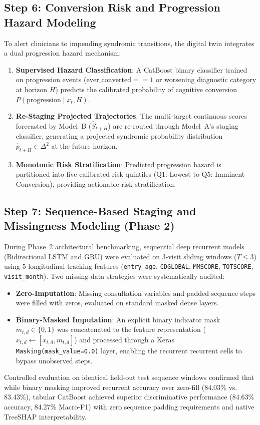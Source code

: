 \documentclass[11pt,a4paper]{article}
\begin{document}
\subsection{Step 6: Conversion Risk and Progression Hazard Modeling}
\label{sec:method_conversion}
To alert clinicians to impending syndromic transitions, the digital twin integrates a dual progression hazard mechanism:
\begin{enumerate}
    \item \textbf{Supervised Hazard Classification}: A CatBoost binary classifier trained on progression events ($\text{ever\_converted} == 1$ or worsening diagnostic category at horizon $H$) predicts the calibrated probability of cognitive conversion $P(\text{progression} \mid x_t, H)$.
    \item \textbf{Re-Staging Projected Trajectories}: The multi-target continuous scores forecasted by Model~B ($\hat{S}_{t+H}$) are re-routed through Model~A's staging classifier, generating a projected syndromic probability distribution $\hat{p}_{t+H} \in \Delta^2$ at the future horizon.
    \item \textbf{Monotonic Risk Stratification}: Predicted progression hazard is partitioned into five calibrated risk quintiles (Q1: Lowest to Q5: Imminent Conversion), providing actionable risk stratification.
\end{enumerate}

\subsection{Step 7: Sequence-Based Staging and Missingness Modeling (Phase 2)}
\label{sec:method_sequence}
During Phase~2 architectural benchmarking, sequential deep recurrent models (Bidirectional LSTM and GRU) were evaluated on 3-visit sliding windows ($T \le 3$) using 5 longitudinal tracking features (\texttt{entry\_age}, \texttt{CDGLOBAL}, \texttt{MMSCORE}, \texttt{TOTSCORE}, \texttt{visit\_month}). Two missing-data strategies were systematically audited:
\begin{itemize}
    \item \textbf{Zero-Imputation}: Missing consultation variables and padded sequence steps were filled with zeros, evaluated on standard masked dense layers.
    \item \textbf{Binary-Masked Imputation}: An explicit binary indicator mask $m_{t,d} \in \{0, 1\}$ was concatenated to the feature representation ($x_{t,d} \leftarrow [x_{t,d}, m_{t,d}]$) and processed through a Keras \texttt{Masking(mask\_value=0.0)} layer, enabling the recurrent recurrent cells to bypass unobserved steps.
\end{itemize}
Controlled evaluation on identical held-out test sequence windows confirmed that while binary masking improved recurrent accuracy over zero-fill (84.03\% vs. 83.43\%), tabular CatBoost achieved superior discriminative performance (84.63\% accuracy, 84.27\% Macro-F1) with zero sequence padding requirements and native TreeSHAP interpretability.
\end{document}
